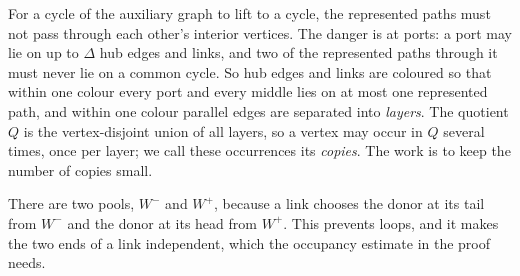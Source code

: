 \documentclass[11pt]{article}
\theoremstyle{definition}
\theoremstyle{remark}
\numberwithin{equation}{section}
\numberwithin{figure}{section}
\numberwithin{table}{section}
\begin{document}
For a cycle of the auxiliary graph to lift to a cycle, the represented paths
must not pass through each other's interior vertices. The danger is at ports: a
port may lie on up to $\Delta$ hub edges and links, and two of the represented
paths through it must never lie on a common cycle. So hub edges and links are
coloured so that within one colour every port and every middle lies on at most
one represented path, and within one colour parallel edges are separated into
\emph{layers}. The quotient $Q$ is the vertex-disjoint union of all layers, so a
vertex may occur in $Q$ several times, once per layer; we call these
occurrences its \emph{copies}. The work is to keep the number of copies small.

There are two pools, $W^-$ and $W^+$, because a link chooses the donor at its
tail from $W^-$ and the donor at its head from $W^+$. This prevents loops, and
it makes the two ends of a link independent, which the occupancy estimate in
the proof needs.
\end{document}
